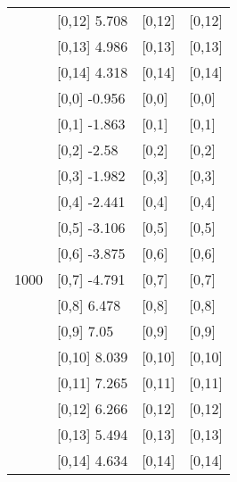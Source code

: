 \begin{table}
\begin{tabular}[t]{llll}
 & {}[0,12] 5.708 & {}[0,12] & {}[0,12]\\
 & {}[0,13] 4.986 & {}[0,13] & {}[0,13]\\
 & {}[0,14] 4.318 & {}[0,14] & {}[0,14]\\
\addlinespace
 & {}[0,0] -0.956 & {}[0,0] & {}[0,0]\\
 & {}[0,1] -1.863 & {}[0,1] & {}[0,1]\\
 & {}[0,2] -2.58 & {}[0,2] & {}[0,2]\\
 & {}[0,3] -1.982 & {}[0,3] & {}[0,3]\\
 & {}[0,4] -2.441 & {}[0,4] & {}[0,4]\\
\addlinespace
 & {}[0,5] -3.106 & {}[0,5] & {}[0,5]\\
 & {}[0,6] -3.875 & {}[0,6] & {}[0,6]\\
1000 & {}[0,7] -4.791 & {}[0,7] & {}[0,7]\\
 & {}[0,8] 6.478 & {}[0,8] & {}[0,8]\\
 & {}[0,9] 7.05 & {}[0,9] & {}[0,9]\\
\addlinespace
 & {}[0,10] 8.039 & {}[0,10] & {}[0,10]\\
 & {}[0,11] 7.265 & {}[0,11] & {}[0,11]\\
 & {}[0,12] 6.266 & {}[0,12] & {}[0,12]\\
 & {}[0,13] 5.494 & {}[0,13] & {}[0,13]\\
 & {}[0,14] 4.634 & {}[0,14] & {}[0,14]\\
\bottomrule
\end{tabular}
\end{table}
